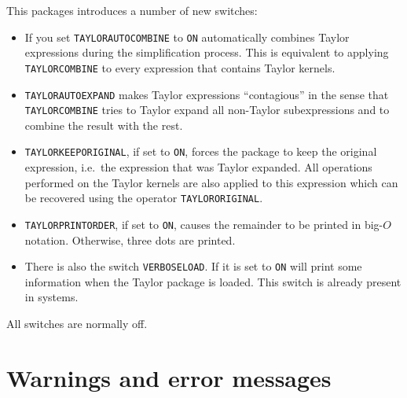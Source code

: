 This packages introduces a number of new switches:
\begin{itemize}

\item If you set \verb|TAYLORAUTOCOMBINE| to \verb|ON| \REDUCE{}
    automatically combines Taylor expressions during the simplification
    process.  This is equivalent to applying \verb|TAYLORCOMBINE| to
    every expression that contains Taylor kernels.

\item \verb|TAYLORAUTOEXPAND| makes Taylor expressions ``contagious''
    in the sense that \verb|TAYLORCOMBINE| tries to Taylor expand
    all non-Taylor subexpressions and to combine the result with the
    rest.

\item \verb|TAYLORKEEPORIGINAL|, if set to \verb|ON|, forces the
    package to keep the original expression, i.e.\ the expression
    that was Taylor expanded.  All operations performed on the
    Taylor kernels are also applied to this expression  which can
    be recovered using the operator \verb|TAYLORORIGINAL|.

\item \verb|TAYLORPRINTORDER|, if set to \verb|ON|, causes the
    remainder to be printed in big-$O$ notation.  Otherwise, three
    dots are printed.

\item There is also the switch \verb|VERBOSELOAD|.  If it is set to
    \verb|ON|
    \REDUCE{} will print some information when the Taylor package is
    loaded.  This switch is already present in \PSL{} systems.

\end{itemize}
All switches are normally off.

\section{Warnings and error messages}


